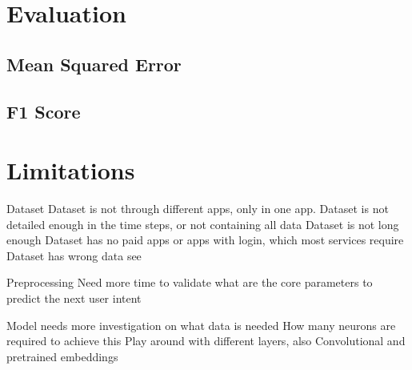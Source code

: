 \section{Evaluation}



\subsection{Mean Squared Error}
\subsection{F1 Score}
\section{Limitations}

Dataset
Dataset is not through different apps, only in one app.
Dataset is not detailed enough in the time steps, or not containing all data
Dataset is not long enough
Dataset has no paid apps or apps with login, which most services require
Dataset has wrong data see \cite{clay}

Preprocessing
Need more time to validate what are the core parameters to predict the next user intent


Model needs more investigation on what data is needed
How many neurons are required to achieve this
Play around with different layers, also Convolutional and pretrained embeddings
